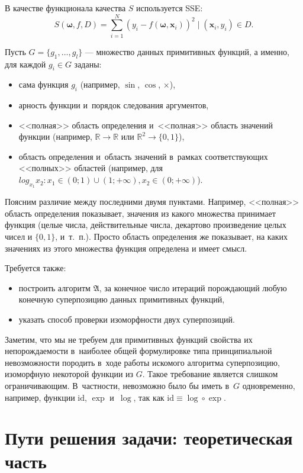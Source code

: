 \documentclass[12pt,a4paper]{amsart}
\begin{document}
В качестве функционала качества $S$ используется SSE:
\begin{equation}
  \label{eq:sse_expr}
  S(\boldsymbol{\omega}, f, D) = \sum_{i=1}^N (y_i - f (\boldsymbol{\omega}, \mathbf{x}_i))^2 \mid (\mathbf{x}_i, y_i) \in D.
\end{equation}

Пусть $G = \{ g_1, \dots, g_l \}$ --- множество данных примитивных
функций, а именно, для каждой $g_i \in G$ заданы:
\begin{itemize}
  \item сама функция $g_i$ (например, $\sin$, $\cos$, $\times$),
  \item арность функции и~порядок следования аргументов,
  \item <<полная>> область определения и~<<полная>> область значений функции
	(например, $\mathbb{R} \to \mathbb{R}$ или $\mathbb{R}^2 \to \{0, 1\}$),
  \item область определения и~область значений в~рамках соответствующих
	<<полных>> областей (например, для $log_{x_1} x_2 : x_1 \in (0; 1) \cup (1; +\infty), x_2 \in (0; +\infty)$).
\end{itemize}

Поясним различие между последними двумя пунктами. Например, <<полная>>
область определения показывает, значения из какого множества принимает
функция (целые числа, действительные числа, декартово произведение целых
чисел и $\{0, 1\}$, и~т.~п.). Просто область определения же показывает,
на каких значениях из этого множества функция определена и имеет смысл.

Требуется также:
\begin{itemize}
  \item построить алгоритм $\mathfrak{A}$, за конечное число итераций
	порождающий любую конечную суперпозицию данных примитивных функций,
  \item указать способ проверки изоморфности двух суперпозиций.
\end{itemize}

Заметим, что мы не требуем для примитивных функций свойства их
непорождаемости в~наиболее общей формулировке типа принципиальной
невозможности породить в~ходе работы искомого алгоритма суперпозицию,
изоморфную некоторой функции из $G$. Такое требование является слишком
ограничивающим. В~частности, невозможно было бы иметь в~$G$ одновременно,
например, функции $\text{id}$, $\exp$ и~$\log$, так как
$\text{id} \equiv \log \circ \exp$.

\section{Пути решения задачи: теоретическая часть}
\end{document}
